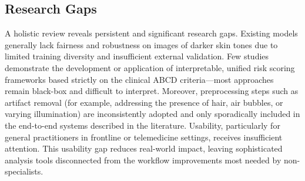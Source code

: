 \documentclass[conference]{IEEEtran}
\begin{document}
\subsection{Research Gaps}
A holistic review reveals persistent and significant research gaps. Existing models generally lack fairness and robustness on images of darker skin tones due to limited training diversity and insufficient external validation. Few studies demonstrate the development or application of interpretable, unified risk scoring frameworks based strictly on the clinical ABCD criteria—most approaches remain black-box and difficult to interpret. Moreover, preprocessing steps such as artifact removal (for example, addressing the presence of hair, air bubbles, or varying illumination) are inconsistently adopted and only sporadically included in the end-to-end systems described in the literature. Usability, particularly for general practitioners in frontline or telemedicine settings, receives insufficient attention. This usability gap reduces real-world impact, leaving sophisticated analysis tools disconnected from the workflow improvements most needed by non-specialists.
\end{document}
